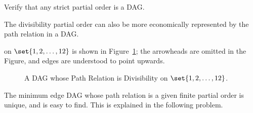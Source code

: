 \begin{notesproblem}
Verify that any strict partial order is a DAG.

\end{notesproblem}


The divisibility partial order can also be more economically represented by
the path relation in a DAG.   on $\set{1,2,\dots,12}$ is shown in
Figure~\ref{fig:divisibility-DAG}; the arrowheads are omitted in the
Figure, and edges are understood to point upwards.

\begin{figure}[h]
\begin{center}

\end{center}
\caption{A DAG whose Path Relation is Divisibility on $\set{1,2,\dots,12}$.}
\label{fig:divisibility-DAG}
\end{figure}

The minimum edge DAG whose path relation is a given finite partial order is
unique, and is easy to find.  This is explained in the following problem.

